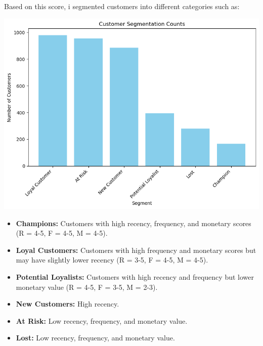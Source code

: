 \documentclass{article}
\renewcommand{\answer}[1]{
  \begin{tcolorbox}[
    breakable,
    enhanced,
    colback=backgroundColor,
    colframe=primaryColor,
    coltitle=white,
    title=Answer
  ]
    #1
  \end{tcolorbox}
}
\begin{document}
\answer{
    Based on this score, i segmented customers into different categories such as:
    \begin{center}
        \includegraphics[width=1\columnwidth]{images/custumer-seg.png}
    \end{center}
    \begin{itemize}
        \item \textbf{Champions:} Customers with high recency, frequency, and monetary scores (R = 4-5, F = 4-5, M = 4-5).
        \item \textbf{Loyal Customers:}  Customers with high frequency and monetary scores but may have slightly lower recency (R = 3-5, F = 4-5, M = 4-5).
        \item \textbf{Potential Loyalists:} Customers with high recency and frequency but lower monetary value (R = 4-5, F = 3-5, M = 2-3).
        \item \textbf{New Customers:} High recency.
        \item \textbf{At Risk:} Low recency, frequency, and monetary value.
        \item \textbf{Lost:} Low recency, frequency, and monetary value.
    \end{itemize}
}

    
    
\end{document}

